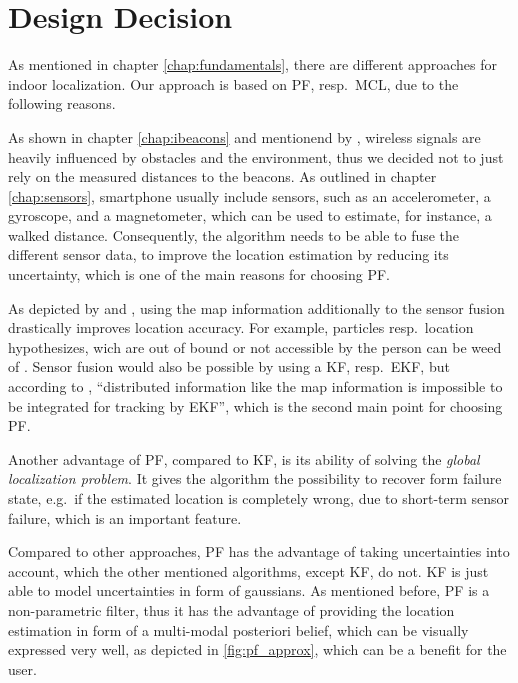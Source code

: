 \section{Design Decision} \label{sec:algo_decision}
As mentioned in chapter \ref{chap:fundamentals}, there are different approaches for indoor localization. Our approach is based on \acl{PF}, resp.\ \acl{MCL}, due to the following reasons.

As shown in chapter \ref{chap:ibeacons} and mentionend by \citet{IEEE:survey_wireless_indoor_pos}, wireless signals are heavily influenced by obstacles and the environment, thus we decided not to just rely on the measured distances to the beacons. As outlined in chapter \ref{chap:sensors}, smartphone usually include sensors, such as an accelerometer, a gyroscope, and a magnetometer, which can be used to estimate, for instance, a walked distance. Consequently, the algorithm needs to be able to fuse the different sensor data, to improve the location estimation by reducing its uncertainty, which is one of the main reasons for choosing \acs{PF}.

As depicted by \citet{siddiqi:experiments_mcl_wifi} and \citet{wang:wlan}, using the map information additionally to the sensor fusion drastically improves location accuracy. For example, particles resp.\ location hypothesizes, wich are out of bound or not accessible by the person can be weed of \citep{straub:pf,siddiqi:experiments_mcl_wifi}. Sensor fusion would also be possible by using a \acl{KF}, resp.\ \acs{EKF}, but according to \citet{wang:wlan}, ``distributed information like the map information is impossible to be integrated for tracking by \acs{EKF}'', which is the second main point for choosing \acs{PF}.

Another advantage of \acs{PF}, compared to \acs{KF}, is its ability of solving the \emph{global localization problem}. It gives the algorithm the possibility to recover form failure state, e.g.\ if the estimated location is completely wrong, due to short-term sensor failure, which is an important feature.

Compared to other approaches, \acs{PF} has the advantage of taking uncertainties into account, which the other mentioned algorithms, except \acs{KF}, do not. \acs{KF} is just able to model uncertainties in form of gaussians. As mentioned before, \acs{PF} is a non-parametric filter, thus it has the advantage of providing the location estimation in form of a multi-modal posteriori belief, which can be visually expressed very well, as depicted in \ref{fig:pf_approx}, which can be a benefit for the user.

